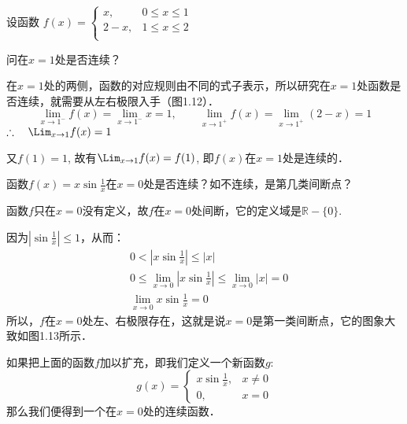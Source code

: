 \begin{example}
    设函数
$f (x) =\begin{cases}
     x,& 0\le x\le 1 \\ 2-x,& 1\le x\le 2\\
\end{cases}$

问在$x=1$处是否连续？
\end{example}

\begin{solution}
  在$x=1$处的两侧，函数的对应规则由不同的式子表示，所以研究在$x=1$处函数是否连续，就需要从左右极限入手（图1.12）．
\[  \lim_{x\to 1^-} f (x) =\lim_{x\to 1^-} x=1,\qquad  \lim_{x\to 1^+} f (x) =\lim_{x\to 1^+} (2-x)=1\]
$\therefore\quad \Lim_{x\to 1}f(x)=1$

又$f(1)=1$, 故有$\Lim_{x\to 1}f(x)=f(1)$, 即$f(x)$在$x=1$处是连续的．
\end{solution}

\begin{example}
    函数$f(x)=x\sin\frac{1}{x}$在$x=0$处是否连续？如不连续，是第几类间断点？
\end{example}

\begin{solution}
    函数$f$只在$x=0$没有定义，故$f$在$x=0$处间断，它的定义域是$\mathbb{R}-\{0\}$.

因为$\left|\sin\frac{1}{x}\right|\le 1$，从而：    
\[\begin{split}
   & 0<\left|x\sin\frac{1}{x}\right|\le |x|\\
&0\le \lim_{x\to 0}\left|x\sin\frac{1}{x}\right|\le \lim_{x\to 0}|x|=0\\
&\lim_{x\to 0}x\sin\frac{1}{x}=0
\end{split}\]
所以，$f$在$x=0$处左、右极限存在，这就是说$x=0$是第一类间断点，它的图象大致如图1.13所示．

\begin{figure}[htp]
    \centering
{}
    \caption{}
\end{figure}


如果把上面的函数$f$加以扩充，即我们定义一个新函数$g$:
\[g(x)=\begin{cases}
    x\sin\frac{1}{x},& x\ne 0\\
    0,& x=0
\end{cases}\]
那么我们便得到一个在$x=0$处的连续函数．
\end{solution}

